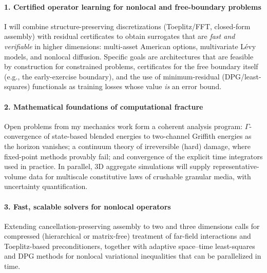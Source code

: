\documentclass[11pt]{article}
\begin{document}
\paragraph{1. Certified operator learning for nonlocal and free-boundary problems}
I will combine structure-preserving discretizations (Toeplitz/FFT, closed-form assembly) with residual certificates to obtain surrogates that are
\emph{fast and verifiable} in higher dimensions: multi-asset American options,
multivariate L\'evy models, and nonlocal diffusion. Specific goals are
architectures that are feasible by construction for constrained problems,
certificates for the free boundary itself (e.g., the early-exercise boundary),
and the use of minimum-residual (DPG/least-squares) functionals as training
losses whose value \emph{is} an error bound.

\paragraph{2. Mathematical foundations of computational fracture}
Open problems from my mechanics work form a coherent analysis program:
$\Gamma$-convergence of state-based blended energies to two-channel Griffith
energies as the horizon vanishes; a continuum theory of irreversible
(hard) damage, where fixed-point methods provably fail; and convergence of the
explicit time integrators used in practice. In parallel, 3D aggregate
simulations will supply representative-volume data for multiscale constitutive
laws of crushable granular media, with uncertainty quantification.

\paragraph{3. Fast, scalable solvers for nonlocal operators}
Extending cancellation-preserving assembly to two and three dimensions calls
for compressed (hierarchical or matrix-free) treatment of far-field interactions
and Toeplitz-based preconditioners, together with adaptive space--time
least-squares and DPG methods for nonlocal variational inequalities that can be
parallelized in time.
\end{document}

